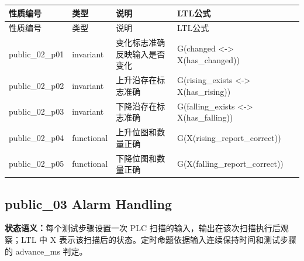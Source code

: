 \begin{longtable}{L{2.3cm}L{1.7cm}L{4.1cm}L{5.2cm}}

\toprule

性质编号 & 类型 & 说明 & LTL公式\\

\midrule

\endfirsthead

\toprule

性质编号 & 类型 & 说明 & LTL公式\\

\midrule

\endhead

{\ttfamily public\_02\_p01} & invariant & 变化标志准确反映输入是否变化 & {\ttfamily G(changed <-> X(has\_changed))}\\

{\ttfamily public\_02\_p02} & invariant & 上升沿存在标志准确 & {\ttfamily G(rising\_exists <-> X(has\_rising))}\\

{\ttfamily public\_02\_p03} & invariant & 下降沿存在标志准确 & {\ttfamily G(falling\_exists <-> X(has\_falling))}\\

{\ttfamily public\_02\_p04} & functional & 上升位图和数量正确 & {\ttfamily G(X(rising\_report\_correct))}\\

{\ttfamily public\_02\_p05} & functional & 下降位图和数量正确 & {\ttfamily G(X(falling\_report\_correct))}\\

\bottomrule

\end{longtable}

\subsection{{\ttfamily public\_03} Alarm Handling}

\noindent\textbf{状态语义：}每个测试步骤设置一次 PLC 扫描的输入，输出在该次扫描执行后观察；LTL 中 X 表示该扫描后的状态。定时命题依据输入连续保持时间和测试步骤的 advance\_ms 判定。

